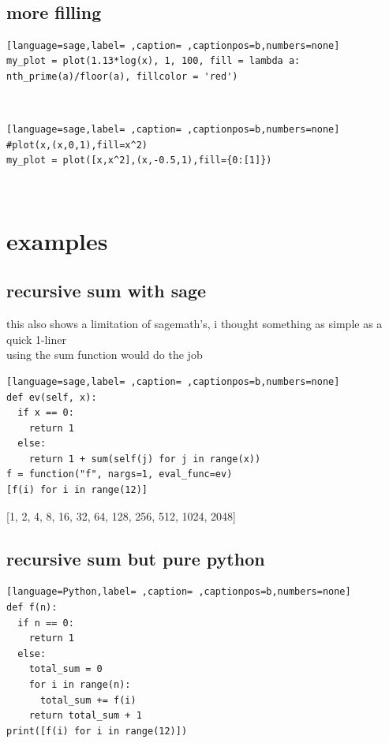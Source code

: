 \documentclass[a4paper,12pt]{article}
\begin{document}
\\[0pt]

\subsection{more filling}
\label{sec:org5eda63f}
\begin{lstlisting}[language=sage,label= ,caption= ,captionpos=b,numbers=none]
my_plot = plot(1.13*log(x), 1, 100, fill = lambda a: nth_prime(a)/floor(a), fillcolor = 'red')

\end{lstlisting}

\\[0pt]

\begin{lstlisting}[language=sage,label= ,caption= ,captionpos=b,numbers=none]
#plot(x,(x,0,1),fill=x^2)
my_plot = plot([x,x^2],(x,-0.5,1),fill={0:[1]})

\end{lstlisting}

\\[0pt]

\section{examples}
\label{sec:org84239d7}
\subsection{recursive sum with sage}
\label{sec:org66ce95f}
this also shows a limitation of sagemath's, i thought something as simple as a quick 1-liner\\[0pt]
using the sum function would do the job\\[0pt]
\begin{lstlisting}[language=sage,label= ,caption= ,captionpos=b,numbers=none]
def ev(self, x):
  if x == 0:
    return 1
  else:
    return 1 + sum(self(j) for j in range(x))
f = function("f", nargs=1, eval_func=ev)
[f(i) for i in range(12)]
\end{lstlisting}

[1, 2, 4, 8, 16, 32, 64, 128, 256, 512, 1024, 2048]\\[0pt]
\subsection{recursive sum but pure python}
\label{sec:org1db9681}
\begin{lstlisting}[language=Python,label= ,caption= ,captionpos=b,numbers=none]
def f(n):
  if n == 0:
    return 1
  else:
    total_sum = 0
    for i in range(n):
      total_sum += f(i)
    return total_sum + 1
print([f(i) for i in range(12)])
\end{lstlisting}
\end{document}
